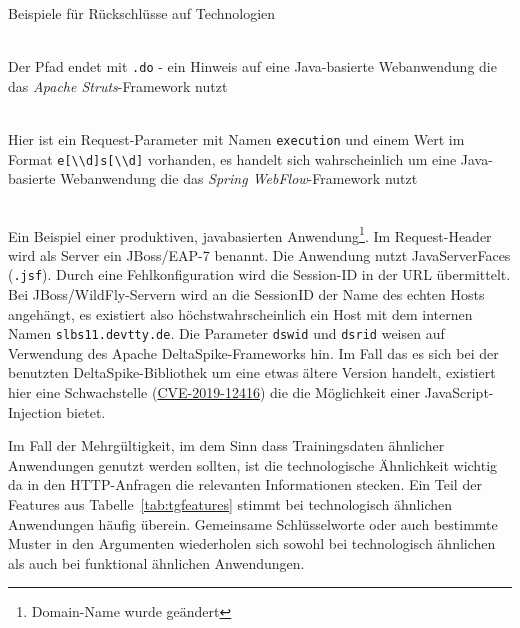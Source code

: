 Beispiele für Rückschlüsse auf Technologien
\begin{description}
  \scriptsize
  \item[http://localhost:8080/\underline{test.do}] \hfill \\
Der Pfad endet mit \verb=.do= - ein Hinweis auf eine Java-basierte Webanwendung die das \emph{Apache Struts}-Framework nutzt
  \item[http://localhost:8080/test?\underline{execution=e2s1}] \hfill \\
Hier ist ein Request-Parameter mit Namen \verb=execution= und einem Wert im Format \verb=e[\\d]s[\\d]= vorhanden, es handelt sich wahrscheinlich um eine Java-basierte Webanwendung die das \emph{Spring WebFlow}-Framework nutzt
  \item[https://devtty.de/app/detail\underline{.jsf};jsessionid=jtO8peEIzV9npU-\_ByEF-9JTq.\underline{slbs11}?\underline{dswid=3942\&dsrid=213}\&id=1041] \hfill \\
Ein Beispiel einer produktiven, javabasierten Anwendung\footnote{Domain-Name wurde geändert}. Im Request-Header wird als Server ein JBoss/EAP-7 benannt. Die Anwendung nutzt JavaServerFaces (\verb=.jsf=). Durch eine Fehlkonfiguration wird die Session-ID in der URL übermittelt. Bei JBoss/WildFly-Servern wird an die SessionID der Name des echten Hosts angehängt, es existiert also höchstwahrscheinlich ein Host mit dem internen Namen \verb=slbs11.devtty.de=. Die Parameter \verb=dswid= und \verb=dsrid= weisen auf Verwendung des Apache DeltaSpike-Frameworks hin. Im Fall das es sich bei der benutzten DeltaSpike-Bibliothek um eine etwas ältere Version handelt, existiert hier eine Schwachstelle (\href{https://cve.mitre.org/cgi-bin/cvename.cgi?name=CVE-2019-12416}{CVE-2019-12416}) die die Möglichkeit einer JavaScript-Injection bietet. 
\end{description}

Im Fall der Mehrgültigkeit, im dem Sinn dass Trainingsdaten ähnlicher Anwendungen genutzt werden sollten, ist die technologische Ähnlichkeit wichtig da in den HTTP-Anfragen die relevanten Informationen stecken. Ein Teil der Features aus Tabelle~\ref{tab:tgfeatures} stimmt bei technologisch ähnlichen Anwendungen häufig überein. Gemeinsame Schlüsselworte oder auch bestimmte Muster in den Argumenten wiederholen sich sowohl bei technologisch ähnlichen als auch bei funktional ähnlichen Anwendungen. \\

